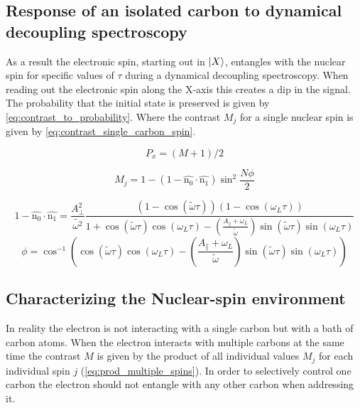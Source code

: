 \subsection{Response of an isolated carbon to dynamical decoupling spectroscopy}

As a result the electronic spin, starting out in ${\left\vert{X}\right\rangle}$, entangles with the nuclear spin for specific values of $\tau$ during a dynamical decoupling spectroscopy.
When reading out the electronic spin along the X-axis this creates a dip in the signal.
The probability that the initial state is preserved is given by \cref{eq:contrast_to_probability}. Where the contrast $M_j$ for a single nuclear spin is given by \cref{eq:contrast_single_carbon_spin}\citep{Taminiau2012Detection}.

\begin{equation}
\label{eq:contrast_to_probability}
P_x = (M+1)/2
\end{equation}

\begin{equation}
\label{eq:contrast_single_carbon_spin}
M_j = 1-(1 - \hat{\bm{\mathrm{n_0}}} \cdot \hat{\bm{\mathrm{n_1}}}) \sin^2 \frac{N\phi}{2}
\end{equation}

\begin{equation}
\label{eq:vec_term}
    1 - \hat{\bm{\mathrm{n_0}}} \cdot \hat{\bm{\mathrm{n_1}}} =  \frac{A_\perp ^2}{\tilde{\omega^2}} \frac{(1- \cos{(\tilde{\omega} \tau)})(1-\cos{(\omega_L \tau)})} {1 +\cos{(\tilde{\omega} \tau)}\cos{(\omega_L \tau)} - (\frac{ A_ \parallel + \omega_L }{ \tilde{ \omega}}) \sin{(\tilde{\omega} \tau)}\sin{(\omega_L \tau)}}
\end{equation}
\begin{equation}
\label{eq:angle_term}
    \phi =  \cos^{-1}\left(\cos(\tilde{\omega} \tau) \cos(\omega_L \tau)-\left(\frac{ A_ \parallel + \omega_L }{ \tilde{ \omega}}\right) \sin(\tilde{\omega} \tau)\sin(\omega_L \tau)\right)
\end{equation}

\subsection{Characterizing the Nuclear-spin environment}

In reality the electron is not interacting with a single carbon but with a bath of carbon atoms. When the electron interacts with multiple carbons at the same time the contrast $M$ is given by the product of all individual values $M_j$ for each individual spin $j$ (\cref{eq:prod_multiple_spins}). In order to selectively control one carbon the electron should not entangle with any other carbon when addressing it.

